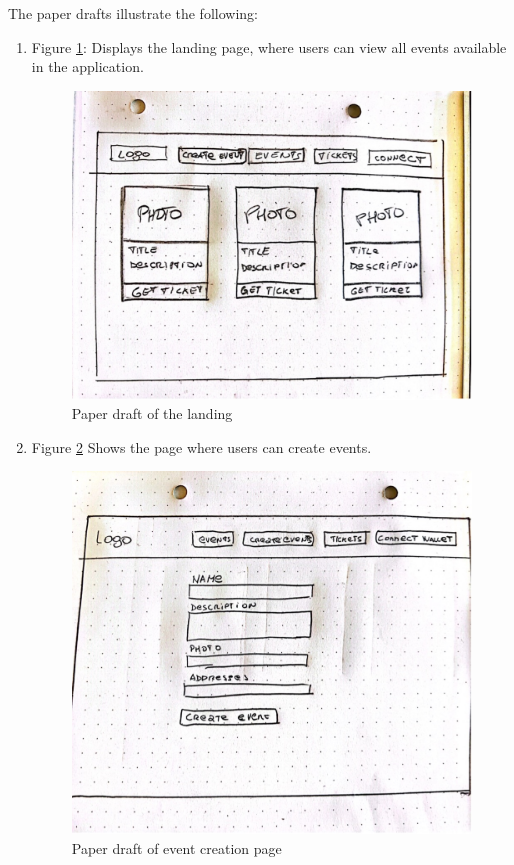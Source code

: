The paper drafts illustrate the following:
\begin{enumerate}
    \item Figure \ref{Abb3}: Displays the landing page, where users can view all events available in the application.\\
    \begin{figure}[H]
    \centering
    \includegraphics[width=1\linewidth]{PICs/Picture1.jpg}
    \caption{Paper draft of the landing}\label{Abb3}
    \end{figure}
    
    \item Figure \ref{Abb4} Shows the page where users can create events.\\
    \begin{figure}[H]
    \centering
    \includegraphics[width=1\linewidth]{PICs/Picture2.jpg}
    \caption{Paper draft of event creation page}\label{Abb4}
    \end{figure}
    

\end{enumerate}
